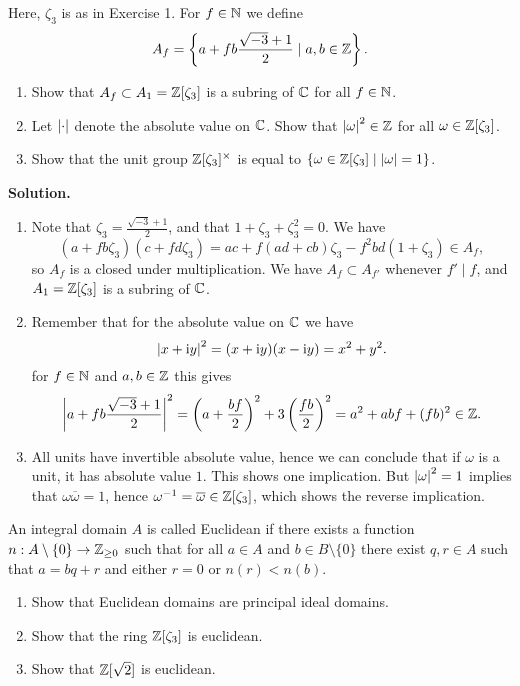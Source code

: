 \documentclass[a4paper,11pt]{article}
\begin{document}
Here, $\zeta_3$ is as in Exercise 1. For $f \in \mathbb{N}$ we define
\begin{equation*}
    A_f = \left \{ a + fb \frac{\sqrt{-3} + 1}2 \mid a, b \in \mathbb{Z} \right \}.
\end{equation*}
\begin{enumerate}
    \item Show that $A_f \subset A_1 = \mathbb{Z}[\zeta_3]$ is a subring of 
        $\mathbb{C}$ for all $f \in \mathbb{N}$. 
    \item Let $\left\lvert \cdot \right\rvert$ denote the absolute value on $\mathbb{C}$. Show that 
        $\left\lvert \omega \right\rvert^2 \in \mathbb{Z}$ for all $\omega \in \mathbb{Z}[\zeta_3]$. 
    \item Show that the unit group $\mathbb{Z}[\zeta_3]^\times$ is equal to
        $\{\omega \in \mathbb{Z}[\zeta_3] \mid \left\lvert \omega \right\rvert = 1\}$. 
\end{enumerate}
\textbf{Solution.}
\begin{enumerate}
    \item Note that $\zeta_3 = \frac{\sqrt{-3} + 1}2$, and that 
        $1 + \zeta_3 + \zeta_3^2 = 0$. We have 
        $$(a + fb \zeta_3)(c + fd \zeta_3) = ac + f(ad + cb)\zeta_3 -
        f^2bd(1+\zeta_3) \in A_f,$$
        so $A_f$ is a closed under multiplication. We have $A_f \subset A_{f'}$
        whenever $f' \mid f$, 
        and $A_1 = \mathbb{Z}[\zeta_3]$ is a subring of $\mathbb{C}$. 
    \item Remember that for the absolute value on $\mathbb{C}$ we have
        \begin{equation*}
            \left\lvert x + \mathrm i y \right\rvert^2 = (x + \mathrm i y)(x - \mathrm i y) = x^2 + y^2.
        \end{equation*}
        for $f \in \mathbb{N}$ and $a, b \in \mathbb{Z}$ this gives
        \begin{equation*}
            \left\lvert a + fb \frac{\sqrt{-3}+1}2 \right\rvert^2 = \left (a + \frac {bf}2\right)^2
            + 3\left( \frac {fb}2 \right)^2 = a^2 + abf + (fb)^2 \in \mathbb{Z}. 
        \end{equation*}
    \item All units have invertible absolute value, hence we can conclude
        that if $\omega$ is a unit, it has absolute value $1$. This
        shows one implication. But $\left\lvert \omega \right\rvert^2 = 1$  
        implies that $\omega \overline \omega = 1$, hence $\omega^{-1} = 
        \overline \omega \in \mathbb{Z}[\zeta_3]$, which shows the reverse implication.
\end{enumerate}

An integral domain $A$ is called Euclidean if there exists a function 
$n: A \setminus \{0\} \to \mathbb{Z}_{\geq 0}$ such that for all $a \in A$ and
$b \in B \setminus \{0\}$ there exist $q, r \in A$ such that 
$a = bq + r$ and either $r = 0$ or $n(r) < n(b)$.
\begin{enumerate}
    \item Show that Euclidean domains are principal ideal domains.
    \item Show that the ring $\mathbb{Z}[\zeta_3]$ is euclidean.
    \item Show that $\mathbb{Z}[\sqrt 2]$ is euclidean.
\end{enumerate}
\end{document}
